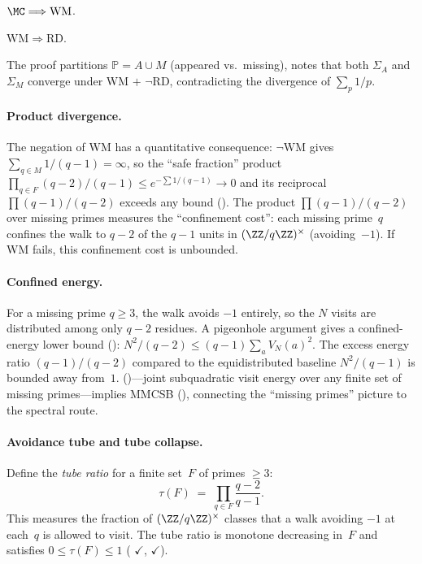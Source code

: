 \begin{theorem}
$\MC \Longrightarrow \mathrm{WM}$.
\end{theorem}

\begin{theorem}
\label{thm:wm-rd}
$\mathrm{WM} \Longrightarrow \mathrm{RD}$.
\end{theorem}

\noindent
The proof partitions $\mathbb{P} = A \cup M$ (appeared vs.\ missing),
notes that both $\Sigma_A$ and $\Sigma_M$ converge under WM $+$ $\neg$RD,
contradicting the divergence of $\sum_{p} 1/p$.

\paragraph{Product divergence.}
The negation of WM has a quantitative consequence: $\neg\mathrm{WM}$ gives
$\sum_{q \in M} 1/(q{-}1) = \infty$, so the ``safe fraction'' product
$\prod_{q \in F}(q{-}2)/(q{-}1) \leq e^{-\sum 1/(q-1)} \to 0$ and its
reciprocal $\prod (q{-}1)/(q{-}2)$ exceeds any bound
().
The product $\prod (q{-}1)/(q{-}2)$ over missing primes measures the
``confinement cost'': each missing prime~$q$ confines the walk to $q-2$
of the $q-1$ units in $(\ZZ/q\ZZ)^\times$ (avoiding~$-1$).  If WM
fails, this confinement cost is unbounded.

\paragraph{Confined energy.}
For a missing prime $q \geq 3$, the walk avoids $-1$ entirely, so the
$N$ visits are distributed among only $q-2$ residues.  A pigeonhole
argument gives a confined-energy lower bound
():
$N^2/(q{-}2) \leq (q{-}1)\sum_a V_N(a)^2$.
The excess energy ratio $(q{-}1)/(q{-}2)$ compared to the
equidistributed baseline $N^2/(q{-}1)$ is bounded away from~$1$.
()---joint subquadratic
visit energy over any finite set of missing primes---implies MMCSB
(),
connecting the ``missing primes'' picture to the spectral route.

\paragraph{Avoidance tube and tube collapse.}
Define the \emph{tube ratio} for a finite set~$F$ of primes $\geq 3$:
\[
  \tau(F) \;=\; \prod_{q \in F} \frac{q-2}{q-1}.
\]
This measures the fraction of $(\ZZ/q\ZZ)^\times$ classes that a walk
avoiding $-1$ at each~$q$ is allowed to visit.  The tube ratio is
monotone decreasing in~$F$ and satisfies $0 \leq \tau(F) \leq 1$
(
{\color{leanink}$\checkmark$},
{\color{leanink}$\checkmark$}).

